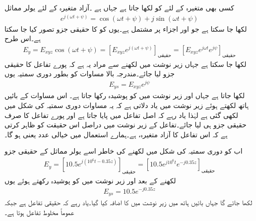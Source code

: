 کسی بھی متغیرہ  کے لئے   کو  لکھا جاتا ہے جہاں   ہے ۔آزاد متغیرہ  کے لئے یولر مماثل
\begin{align*}
e^{j (\omega t +\psi)}=\cos (\omega t +\psi) +j \sin (\omega t +\psi)
\end{align*}
لکھا جا سکتا ہے جو  اور  اجزاء پر مشتمل   ہے۔یوں  کو  کا حقیقی جزو تصور کیا جا سکتا ہے۔اس طرح
\begin{align*}
E_y=E_{xyz} \cos (\omega t +\psi)= \left[E_{xyz} e^{j(\omega t +\psi)}\right]_{\textrm{حقیقی}}= \left[E_{xyz} e^{j \omega t }e^{j\psi}\right]_{\textrm{حقیقی}}
\end{align*}
لکھا جا سکتا ہے جہاں زیر نوشت میں  لکھنے سے مراد یہ ہے کہ پورے تفاعل کا حقیقی جزو لیا جائے۔مندرجہ بالا مساوات کو بطور دوری سمتیہ یوں
\begin{align*}
E_{ys} =E_{xyz} e^{j \psi}
\end{align*}
 لکھا جاتا ہے جہاں   اور زیر نوشت میں  کو پوشیدہ رکھا جاتا ہے۔ اس مساوات کے بائیں ہاتھ  لکھتے ہوئے زیر نوشت میں  یاد دلاتی ہے کہ یہ مساوات دوری سمتیہ کی شکل میں لکھی گئی ہے لہٰذا یاد رہے کہ اصل تفاعل میں  پایا جاتا ہے اور پورے تفاعل کا صرف حقیقی جزو ہی لیا جائے۔تفاعل  کے زیر نوشت میں  دراصل اس حقیقت کو ظاہر کرتی ہے کہ  اس تفاعل کا آزاد متغیرہ،   ہے۔ہمارے استعمال میں   خیالی عدد یعنی  ہو گا۔

اب  کو دوری سمتیہ کی شکل میں لکھنے کی خاطر اسے یولر مماثل کے حقیقی جزو
\begin{align*}
E_y=\left[10.5 e^{j(10^6 t -0.35z)} \right]_{\textrm{حقیقی}}=\left[10.5 e^{j10^6 t} e^{ -j0.35z} \right]_{\textrm{حقیقی}}
\end{align*}
لکھنے کے بعد  اور زیر نوشت میں  کو پوشیدہ رکھتے ہوئے یوں
\begin{align*}
E_{ys}=10.5 e^{-j 0.35z}
\end{align*} 
لکھا جائے گا جہاں بائیں ہاتھ  میں زیر نوشت میں  کا اضافہ کیا گیا۔یاد رہے کہ  حقیقی تفاعل ہے جبکہ  عموماً مخلوط تفاعل ہوتا ہے۔

